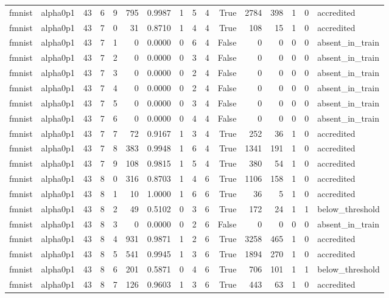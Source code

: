\begin{tabular}{llrrrrrrrrrrrrrl}
fmnist & alpha0p1 & 43 & 6 & 9 & 795 & 0.9987 & 1 & 5 & 4 & True & 2784 & 398 & 1 & 0 & accredited \\
fmnist & alpha0p1 & 43 & 7 & 0 & 31 & 0.8710 & 1 & 4 & 4 & True & 108 & 15 & 1 & 0 & accredited \\
fmnist & alpha0p1 & 43 & 7 & 1 & 0 & 0.0000 & 0 & 6 & 4 & False & 0 & 0 & 0 & 0 & absent\_in\_train \\
fmnist & alpha0p1 & 43 & 7 & 2 & 0 & 0.0000 & 0 & 3 & 4 & False & 0 & 0 & 0 & 0 & absent\_in\_train \\
fmnist & alpha0p1 & 43 & 7 & 3 & 0 & 0.0000 & 0 & 2 & 4 & False & 0 & 0 & 0 & 0 & absent\_in\_train \\
fmnist & alpha0p1 & 43 & 7 & 4 & 0 & 0.0000 & 0 & 2 & 4 & False & 0 & 0 & 0 & 0 & absent\_in\_train \\
fmnist & alpha0p1 & 43 & 7 & 5 & 0 & 0.0000 & 0 & 3 & 4 & False & 0 & 0 & 0 & 0 & absent\_in\_train \\
fmnist & alpha0p1 & 43 & 7 & 6 & 0 & 0.0000 & 0 & 4 & 4 & False & 0 & 0 & 0 & 0 & absent\_in\_train \\
fmnist & alpha0p1 & 43 & 7 & 7 & 72 & 0.9167 & 1 & 3 & 4 & True & 252 & 36 & 1 & 0 & accredited \\
fmnist & alpha0p1 & 43 & 7 & 8 & 383 & 0.9948 & 1 & 6 & 4 & True & 1341 & 191 & 1 & 0 & accredited \\
fmnist & alpha0p1 & 43 & 7 & 9 & 108 & 0.9815 & 1 & 5 & 4 & True & 380 & 54 & 1 & 0 & accredited \\
fmnist & alpha0p1 & 43 & 8 & 0 & 316 & 0.8703 & 1 & 4 & 6 & True & 1106 & 158 & 1 & 0 & accredited \\
fmnist & alpha0p1 & 43 & 8 & 1 & 10 & 1.0000 & 1 & 6 & 6 & True & 36 & 5 & 1 & 0 & accredited \\
fmnist & alpha0p1 & 43 & 8 & 2 & 49 & 0.5102 & 0 & 3 & 6 & True & 172 & 24 & 1 & 1 & below\_threshold \\
fmnist & alpha0p1 & 43 & 8 & 3 & 0 & 0.0000 & 0 & 2 & 6 & False & 0 & 0 & 0 & 0 & absent\_in\_train \\
fmnist & alpha0p1 & 43 & 8 & 4 & 931 & 0.9871 & 1 & 2 & 6 & True & 3258 & 465 & 1 & 0 & accredited \\
fmnist & alpha0p1 & 43 & 8 & 5 & 541 & 0.9945 & 1 & 3 & 6 & True & 1894 & 270 & 1 & 0 & accredited \\
fmnist & alpha0p1 & 43 & 8 & 6 & 201 & 0.5871 & 0 & 4 & 6 & True & 706 & 101 & 1 & 1 & below\_threshold \\
fmnist & alpha0p1 & 43 & 8 & 7 & 126 & 0.9603 & 1 & 3 & 6 & True & 443 & 63 & 1 & 0 & accredited \\

\end{tabular}
